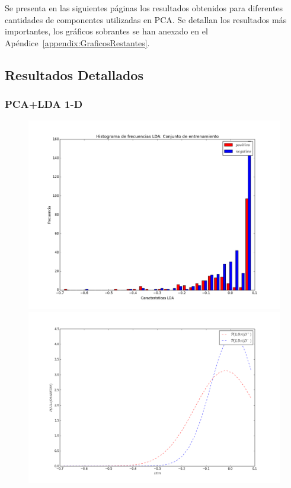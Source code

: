 \documentclass[letter, titlepage, 10pt]{article}
\begin{document}
Se presenta en las siguientes páginas los resultados obtenidos para diferentes cantidades de componentes utilizadas en PCA. Se detallan los resultados más importantes, los gráficos sobrantes se han anexado en el Apéndice~\ref{appendix:GraficosRestantes}.

\subsection{Resultados Detallados}
\subsubsection{PCA+LDA 1-D}
  \begin{figure}[H]
  \centering
    \begin{minipage}{.5\textwidth}
        \centering
        \includegraphics[width=1\linewidth]{images/Histograma_D1}
    \end{minipage}%
    \begin{minipage}{.5\textwidth}
        \centering
        \includegraphics[width=1\linewidth]{images/PDF_D1}

\end{minipage}
\end{figure}
\end{document}
